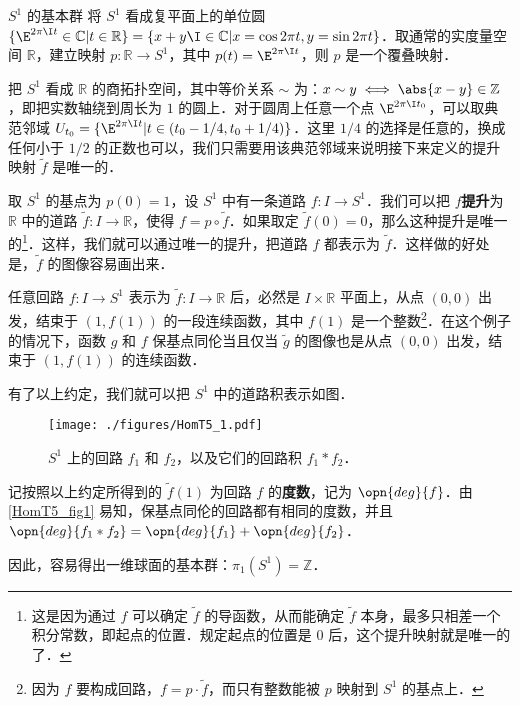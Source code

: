 \begin{example}{$S^1$ 的基本群}\label{HomT5_ex2}
将 $S^1$ 看成复平面上的单位圆 $\{\E^{2\pi\I t}\in\mathbb{C}|t\in\mathbb{R}\}=\{x+y\I\in\mathbb{C}|x=\cos{2\pi t}, y=\sin{2\pi t}\}$．取通常的实度量空间 $\mathbb{R}$，建立映射 $p:\mathbb{R}\rightarrow S^1$，其中 $p(t)=\E^{2\pi\I t}$，则 $p$ 是一个覆叠映射．

把 $S^1$ 看成 $\mathbb{R}$ 的商拓扑空间，其中等价关系 $\sim$ 为：$x\sim y\iff \abs{x-y}\in\mathbb{Z}$，即把实数轴绕到周长为 $1$ 的圆上．对于圆周上任意一个点 $\E^{2\pi\I t_0}$，可以取典范邻域 $U_{t_0}=\{\E^{2\pi\I t}|t\in(t_0-1/4, t_0+1/4)\}$．这里 $1/4$ 的选择是任意的，换成任何小于 $1/2$ 的正数也可以，我们只需要用该典范邻域来说明接下来定义的提升映射 $\tilde{f}$ 是唯一的．

取 $S^1$ 的基点为 $p(0)=1$，设 $S^1$ 中有一条道路 $f:I\rightarrow S^1$．我们可以把 $f$\textbf{提升}为 $\mathbb{R}$ 中的道路 $\tilde{f}:I\rightarrow\mathbb{R}$，使得 $f=p\circ\tilde{f}$．如果取定 $\tilde{f}(0)=0$，那么这种提升是唯一的\footnote{这是因为通过 $f$ 可以确定 $\tilde{f}$ 的导函数，从而能确定 $\tilde{f}$ 本身，最多只相差一个积分常数，即起点的位置．规定起点的位置是 $0$ 后，这个提升映射就是唯一的了．}．这样，我们就可以通过唯一的提升，把道路 $f$ 都表示为 $\tilde{f}$．这样做的好处是，$\tilde{f}$ 的图像容易画出来．

任意回路 $f:I\rightarrow S^1$ 表示为 $\tilde{f}:I\rightarrow\mathbb{R}$ 后，必然是 $I\times\mathbb{R}$ 平面上，从点 $(0, 0)$ 出发，结束于 $(1, f(1))$ 的一段连续函数，其中 $f(1)$ 是一个整数\footnote{因为 $f$ 要构成回路，$f=p\cdot\tilde{f}$，而只有整数能被 $p$ 映射到 $S^1$ 的基点上．}．在这个例子的情况下，函数 $g$ 和 $f$ 保基点同伦当且仅当 $\tilde{g}$ 的图像也是从点 $(0, 0)$ 出发，结束于 $(1, f(1))$ 的连续函数．

有了以上约定，我们就可以把 $S^1$ 中的道路积表示如图．

\begin{figure}[ht]
\centering
\texttt{[image: ./figures/HomT5\_1.pdf]}
\caption{$S^1$ 上的回路 $f_1$ 和 $f_2$，以及它们的回路积 $f_1*f_2$．} \label{HomT5_fig1}
\end{figure}

记按照以上约定所得到的 $\tilde{f}(1)$ 为回路 $f$ 的\textbf{度数}，记为 $\opn{deg}{f}$．由\autoref{HomT5_fig1} 易知，保基点同伦的回路都有相同的度数，并且 $\opn{deg}{f_1*f_2}=\opn{deg}{f_1}+\opn{deg}{f_2}$．

因此，容易得出一维球面的基本群：$\pi_1(S^1)=\mathbb{Z}$．


\end{example}

